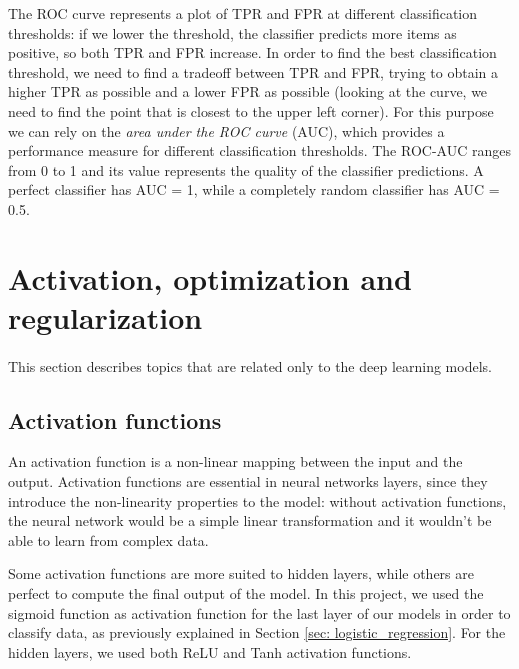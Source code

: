 The ROC curve represents a plot of TPR and FPR at different classification thresholds: if we lower the threshold, the classifier predicts more items as positive, so both TPR and FPR increase. In order to find the best classification threshold, we need to find a tradeoff between TPR and FPR, trying to obtain a higher TPR as possible and a lower FPR as possible (looking at the curve, we need to find the point that is closest to the upper left corner). For this purpose we can rely on the \textit{area under the ROC curve} (AUC), which provides a performance measure for different classification thresholds. The ROC-AUC ranges
from 0 to 1 and its value represents the quality of the classifier predictions. A perfect classifier has AUC = 1, while a completely random classifier has AUC = 0.5.


\section{Activation, optimization and regularization} \label{sec: activation_optimization_regularization}
\paragraph{} This section describes topics that are related only to the deep learning models.

\subsection{Activation functions}
An activation function is a non-linear mapping between the input and the output. Activation functions are essential in neural networks layers, since they introduce the non-linearity properties to the model: without activation functions, the neural network would be a simple linear transformation and it wouldn't be able to learn from complex data.

Some activation functions are more suited to hidden layers, while others are perfect to compute the final output of the model. In this project, we used the sigmoid function as activation function for the last layer of our models in order to classify data, as previously explained in Section \ref{sec: logistic_regression}. For the hidden layers, we used both ReLU and Tanh activation functions.

